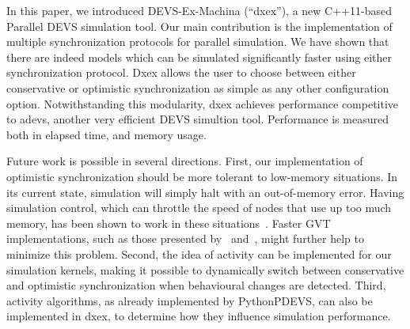 In this paper, we introduced DEVS-Ex-Machina (``dxex''), a new C++11-based \textsf{Parallel DEVS} simulation tool.
Our main contribution is the implementation of multiple synchronization protocols for parallel simulation.
We have shown that there are indeed models which can be simulated significantly faster using either synchronization protocol.
Dxex allows the user to choose between either conservative or optimistic synchronization as simple as any other configuration option.
Notwithstanding this modularity, dxex achieves performance competitive to adevs, another very efficient \textsf{DEVS} simultion tool.
Performance is measured both in elapsed time, and memory usage.

Future work is possible in several directions.
First, our implementation of optimistic synchronization should be more tolerant to low-memory situations.
In its current state, simulation will simply halt with an out-of-memory error.
Having simulation control, which can throttle the speed of nodes that use up too much memory, has been shown to work in these situations~\cite{FujimotoBook}.
Faster GVT implementations, such as those presented by~\cite{Fujimoto:1997:CGV:268403.268404} and~\cite{Bauer:2005:SND:1069810.1070159}, might further help to minimize this problem.
Second, the idea of activity can be implemented for our simulation kernels, making it possible to dynamically switch between conservative and optimistic synchronization when behavioural changes are detected.
Third, activity algorithms, as already implemented by PythonPDEVS, can also be implemented in dxex, to determine how they influence simulation performance.
